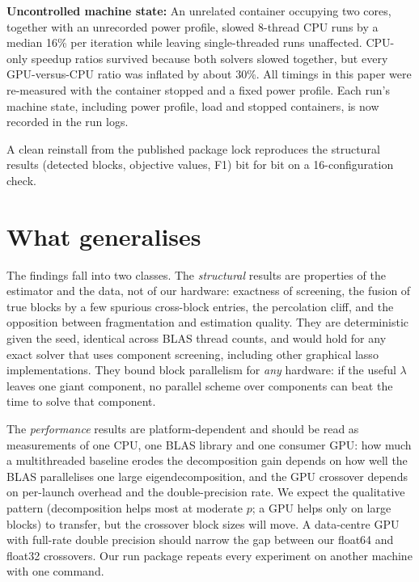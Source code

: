 \documentclass[conference]{IEEEtran}
\begin{document}
\textbf{Uncontrolled machine state:} An unrelated container occupying two
cores, together with an unrecorded power profile, slowed 8-thread CPU runs
by a median 16\% per iteration while leaving single-threaded runs
unaffected. CPU-only speedup ratios survived because both solvers slowed
together, but every GPU-versus-CPU ratio was inflated by about 30\%. All timings in this paper were re-measured with the container stopped and a
fixed power profile. Each run's machine state, including power profile, load
and stopped containers, is now recorded in the run logs.

A clean reinstall from the published package lock reproduces the
structural results (detected blocks, objective values, F1) bit for bit on a
16-configuration check.

\section{What generalises}
The findings fall into two classes. The \emph{structural} results are
properties of the estimator and the data, not of our hardware: exactness of
screening, the fusion of true blocks by a few spurious cross-block entries,
the percolation cliff, and the opposition between fragmentation and
estimation quality. They are deterministic given the seed, identical across
BLAS thread counts, and would hold for any exact solver that uses component
screening, including other graphical lasso implementations. They bound
block parallelism for \emph{any} hardware: if the useful $\lambda$ leaves one
giant component, no parallel scheme over components can beat the time to
solve that component.

The \emph{performance} results are platform-dependent and should be read as
measurements of one CPU, one BLAS library and one consumer GPU: how much a
multithreaded baseline erodes the decomposition gain depends on how well the
BLAS parallelises one large eigendecomposition, and the GPU crossover depends
on per-launch overhead and the double-precision rate. We expect the
qualitative pattern (decomposition helps most at moderate $p$; a GPU helps
only on large blocks) to transfer, but the crossover block sizes will move.
A data-centre GPU with full-rate double precision should narrow the gap
between our float64 and float32 crossovers. Our run package repeats every
experiment on another machine with one command.

\end{document}
